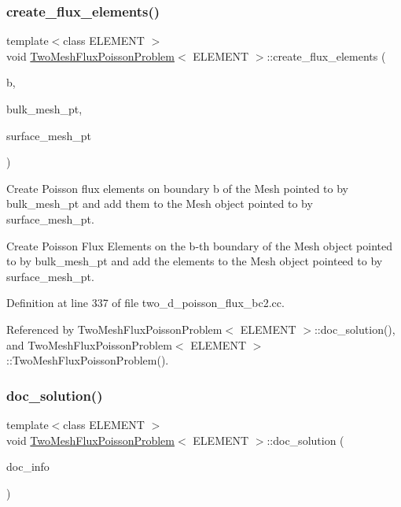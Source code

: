 \subsubsection{\texorpdfstring{create\+\_\+flux\+\_\+elements()}{create\_flux\_elements()}}
{\footnotesize\ttfamily template$<$class E\+L\+E\+M\+E\+NT $>$ \\
void \hyperlink{classTwoMeshFluxPoissonProblem}{Two\+Mesh\+Flux\+Poisson\+Problem}$<$ E\+L\+E\+M\+E\+NT $>$\+::create\+\_\+flux\+\_\+elements (\begin{DoxyParamCaption}\item[{const unsigned \&}]{b,  }\item[{Mesh $\ast$const \&}]{bulk\+\_\+mesh\+\_\+pt,  }\item[{Mesh $\ast$const \&}]{surface\+\_\+mesh\+\_\+pt }\end{DoxyParamCaption})\hspace{0.3cm}{\ttfamily [private]}}



Create Poisson flux elements on boundary b of the Mesh pointed to by bulk\+\_\+mesh\+\_\+pt and add them to the Mesh object pointed to by surface\+\_\+mesh\+\_\+pt. 

Create Poisson Flux Elements on the b-\/th boundary of the Mesh object pointed to by bulk\+\_\+mesh\+\_\+pt and add the elements to the Mesh object pointeed to by surface\+\_\+mesh\+\_\+pt. 

Definition at line 337 of file two\+\_\+d\+\_\+poisson\+\_\+flux\+\_\+bc2.\+cc.



Referenced by Two\+Mesh\+Flux\+Poisson\+Problem$<$ E\+L\+E\+M\+E\+N\+T $>$\+::doc\+\_\+solution(), and Two\+Mesh\+Flux\+Poisson\+Problem$<$ E\+L\+E\+M\+E\+N\+T $>$\+::\+Two\+Mesh\+Flux\+Poisson\+Problem().

\mbox{\label{classTwoMeshFluxPoissonProblem_a6320ad6d71f24a2d7e03a7bb7e691b31}} 
\subsubsection{\texorpdfstring{doc\+\_\+solution()}{doc\_solution()}}
{\footnotesize\ttfamily template$<$class E\+L\+E\+M\+E\+NT $>$ \\
void \hyperlink{classTwoMeshFluxPoissonProblem}{Two\+Mesh\+Flux\+Poisson\+Problem}$<$ E\+L\+E\+M\+E\+NT $>$\+::doc\+\_\+solution (\begin{DoxyParamCaption}\item[{Doc\+Info \&}]{doc\+\_\+info }\end{DoxyParamCaption})}



